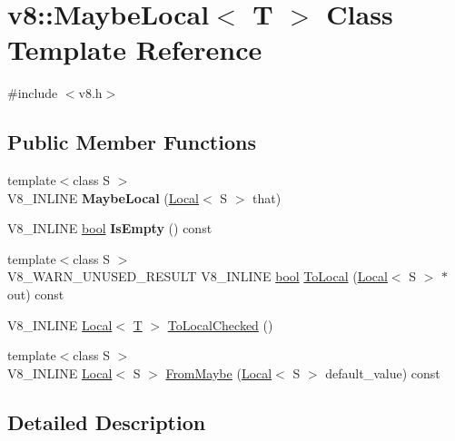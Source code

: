 \hypertarget{classv8_1_1MaybeLocal}{}\section{v8\+:\+:Maybe\+Local$<$ T $>$ Class Template Reference}
\label{classv8_1_1MaybeLocal}


{\ttfamily \#include $<$v8.\+h$>$}

\subsection*{Public Member Functions}
\begin{DoxyCompactItemize}
\item 
\mbox{\label{classv8_1_1MaybeLocal_ab488843c2faf4375517616d3c66886e5}} 
{\footnotesize template$<$class S $>$ }\\V8\+\_\+\+I\+N\+L\+I\+NE {\bfseries Maybe\+Local} (\mbox{\hyperlink{classv8_1_1Local}{Local}}$<$ S $>$ that)
\item 
\mbox{\label{classv8_1_1MaybeLocal_aa321cd3ec18e64d893bc14b21e4624f4}} 
V8\+\_\+\+I\+N\+L\+I\+NE \mbox{\hyperlink{classbool}{bool}} {\bfseries Is\+Empty} () const
\item 
{\footnotesize template$<$class S $>$ }\\V8\+\_\+\+W\+A\+R\+N\+\_\+\+U\+N\+U\+S\+E\+D\+\_\+\+R\+E\+S\+U\+LT V8\+\_\+\+I\+N\+L\+I\+NE \mbox{\hyperlink{classbool}{bool}} \mbox{\hyperlink{classv8_1_1MaybeLocal_aa12fc83adccbf02f502a2aaeed9c32ab}{To\+Local}} (\mbox{\hyperlink{classv8_1_1Local}{Local}}$<$ S $>$ $\ast$out) const
\item 
V8\+\_\+\+I\+N\+L\+I\+NE \mbox{\hyperlink{classv8_1_1Local}{Local}}$<$ \mbox{\hyperlink{classv8_1_1internal_1_1torque_1_1T}{T}} $>$ \mbox{\hyperlink{classv8_1_1MaybeLocal_a9b2c9d50fca5897e3a03fd4c25d12415}{To\+Local\+Checked}} ()
\item 
{\footnotesize template$<$class S $>$ }\\V8\+\_\+\+I\+N\+L\+I\+NE \mbox{\hyperlink{classv8_1_1Local}{Local}}$<$ S $>$ \mbox{\hyperlink{classv8_1_1MaybeLocal_ad99cb1e7ac1a4eac34c144faa4262407}{From\+Maybe}} (\mbox{\hyperlink{classv8_1_1Local}{Local}}$<$ S $>$ default\+\_\+value) const
\end{DoxyCompactItemize}


\subsection{Detailed Description}
